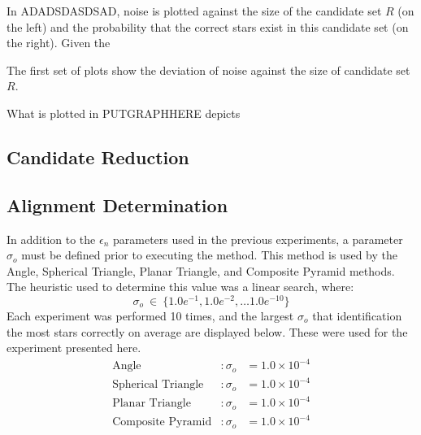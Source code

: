 In ADADSDASDSAD, noise is plotted against the size of the candidate set $R$ (on the left) and the probability that the
correct stars exist in this candidate set (on the right).
Given the

The first set of plots show the deviation of noise against the size of candidate set $R$.


What is plotted in PUTGRAPHHERE depicts

\subsection{Candidate Reduction}\label{subsec:candidateReductionAnalysis}


\subsection{Alignment Determination}\label{subsec:alignmentDeterminationAnalysis}
In addition to the $\epsilon_n$ parameters used in the previous experiments, a parameter $\sigma_o$ must be defined
prior to executing the  method.
This method is used by the Angle, Spherical Triangle, Planar Triangle, and Composite Pyramid methods.
The heuristic used to determine this value was a linear search, where:
\begin{equation}
    \label{eq:gridSearchSigma}
    \sigma_o \ \in \ \{1.0e^{-1}, 1.0e^{-2}, \ldots 1.0e^{-10}\}
\end{equation}
Each experiment was performed 10 times, and the largest $\sigma_o$ that identification the most stars correctly on
average are displayed below.
These were used for the experiment presented here.
\begin{align*}
    \text{Angle}&: \sigma_o &= 1.0 \times 10^{-4}\\
    \text{Spherical Triangle}&: \sigma_o &= 1.0 \times 10^{-4}\\
    \text{Planar Triangle}&: \sigma_o &= 1.0 \times 10^{-4}\\
    \text{Composite Pyramid}&: \sigma_o &= 1.0 \times 10^{-4}\\
\end{align*}
